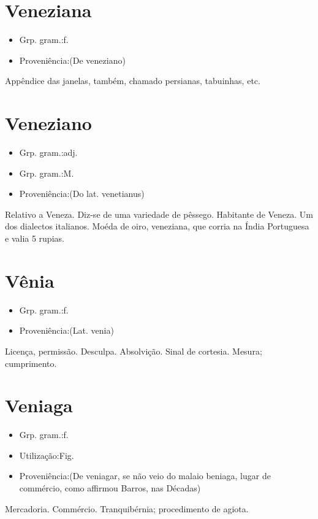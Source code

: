 \documentclass{article}
\begin{document}
\section{Veneziana}
\begin{itemize}
\item {Grp. gram.:f.}
\end{itemize}
\begin{itemize}
\item {Proveniência:(De \textunderscore veneziano\textunderscore )}
\end{itemize}
Appêndice das janelas, também, chamado \textunderscore persianas\textunderscore , \textunderscore tabuinhas\textunderscore , etc.
\section{Veneziano}
\begin{itemize}
\item {Grp. gram.:adj.}
\end{itemize}
\begin{itemize}
\item {Grp. gram.:M.}
\end{itemize}
\begin{itemize}
\item {Proveniência:(Do lat. \textunderscore venetianus\textunderscore )}
\end{itemize}
Relativo a Veneza.
Diz-se de uma variedade de pêssego.
Habitante de Veneza.
Um dos dialectos italianos.
Moéda de oiro, veneziana, que corria na Índia Portuguesa e valia 5 rupias.
\section{Vênia}
\begin{itemize}
\item {Grp. gram.:f.}
\end{itemize}
\begin{itemize}
\item {Proveniência:(Lat. \textunderscore venia\textunderscore )}
\end{itemize}
Licença, permissão.
Desculpa.
Absolvição.
Sinal de cortesia.
Mesura; cumprimento.
\section{Veniaga}
\begin{itemize}
\item {Grp. gram.:f.}
\end{itemize}
\begin{itemize}
\item {Utilização:Fig.}
\end{itemize}
\begin{itemize}
\item {Proveniência:(De \textunderscore veniagar\textunderscore , se não veio do malaio \textunderscore beniaga\textunderscore , lugar de commércio, como affirmou Barros, nas \textunderscore Décadas\textunderscore )}
\end{itemize}
Mercadoria.
Commércio.
Tranquibérnia; procedimento de agiota.
\end{document}
